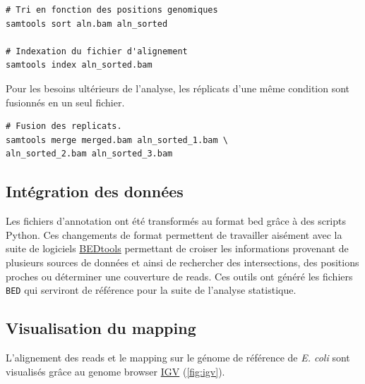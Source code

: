 \documentclass[12pt,a4paper]{report}
\begin{document}
\begin{onehalfspace}
\begin{lstlisting}[frame=single]
# Tri en fonction des positions genomiques
samtools sort aln.bam aln_sorted

# Indexation du fichier d'alignement
samtools index aln_sorted.bam
\end{lstlisting}

Pour les besoins ultérieurs de l'analyse, les réplicats d'une même condition sont fusionnés en un seul fichier.
\begin{lstlisting}[frame=single]
# Fusion des replicats.
samtools merge merged.bam aln_sorted_1.bam \
aln_sorted_2.bam aln_sorted_3.bam
\end{lstlisting}

\subsection*{Intégration des données}
Les fichiers d'annotation ont été transformés au format \gls{bed} grâce à des scripts Python.
Ces changements de format permettent de travailler aisément avec la suite de logiciels \href{http://bedtools.readthedocs.org/en/latest/}{BEDtools} permettant de croiser les informations provenant de plusieurs sources de données et ainsi de rechercher des intersections, des positions proches ou déterminer une \gls{couverture} de reads. Ces outils ont généré les fichiers \texttt{BED} qui serviront de référence pour la suite de l'analyse statistique.

\subsection*{Visualisation du mapping}
L'alignement des reads et le mapping sur le génome de référence de \textit{E. coli} sont visualisés grâce au genome browser \href{https://www.broadinstitute.org/igv/}{IGV} \citep{Robinson2011,Thorvaldsdottir2013} (\autoref{fig:igv}).


\end{onehalfspace}
\end{document}
